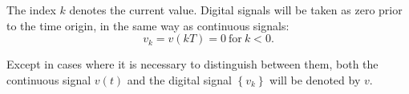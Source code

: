 The index $k$ denotes the current value. Digital signals will be
taken as zero prior to the time origin, in the same way as
continuous signals:
\[ v_k = v(kT) = 0\ \mathrm{for}\ k<0. \]

Except in cases where it is necessary to distinguish between them,
both the continuous signal $v(t)$ and the digital signal
$\left\{v_k\right\}$ will be denoted by $v$.
\endinput

